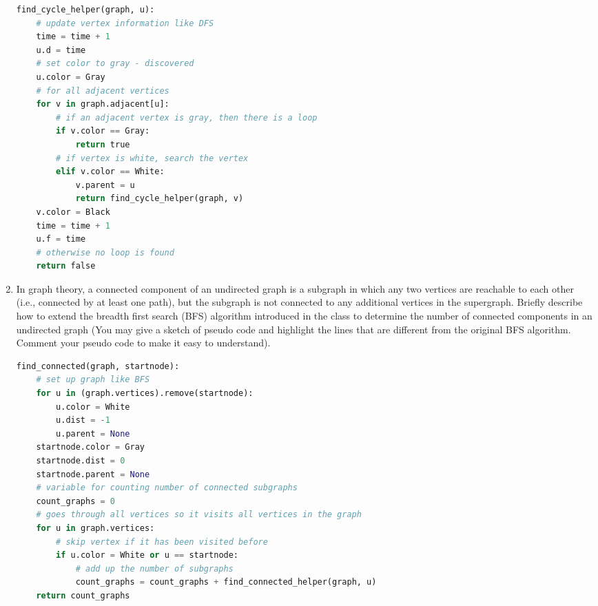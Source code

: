 \documentclass{article}
\begin{document}
\begin{enumerate}
\begin{lstlisting}[language=python]
find_cycle_helper(graph, u):
    # update vertex information like DFS
    time = time + 1
    u.d = time
    # set color to gray - discovered
    u.color = Gray
    # for all adjacent vertices
    for v in graph.adjacent[u]:
        # if an adjacent vertex is gray, then there is a loop
        if v.color == Gray:
            return true
        # if vertex is white, search the vertex
        elif v.color == White:
            v.parent = u
            return find_cycle_helper(graph, v)
    v.color = Black
    time = time + 1
    u.f = time
    # otherwise no loop is found
    return false
            \end{lstlisting}
        \item In graph theory, a connected component of an undirected graph is 
        a subgraph in which any two vertices are reachable to each other 
        (i.e., connected by at least one path), but the subgraph is not 
        connected to any additional vertices in the supergraph. Briefly 
        describe how to extend the breadth first search (BFS) algorithm 
        introduced in the class to determine the number of connected 
        components in an undirected graph (You may give a sketch of pseudo 
        code and highlight the lines that are different from the original BFS 
        algorithm. Comment your pseudo code to make it easy to understand).
            \begin{lstlisting}[language=python]
find_connected(graph, startnode):
    # set up graph like BFS
    for u in (graph.vertices).remove(startnode):
        u.color = White
        u.dist = -1
        u.parent = None
    startnode.color = Gray
    startnode.dist = 0
    startnode.parent = None
    # variable for counting number of connected subgraphs
    count_graphs = 0
    # goes through all vertices so it visits all vertices in the graph
    for u in graph.vertices:
        # skip vertex if it has been visited before
        if u.color = White or u == startnode:
            # add up the number of subgraphs
            count_graphs = count_graphs + find_connected_helper(graph, u)
    return count_graphs


\end{lstlisting}
\end{enumerate}
\end{document}
